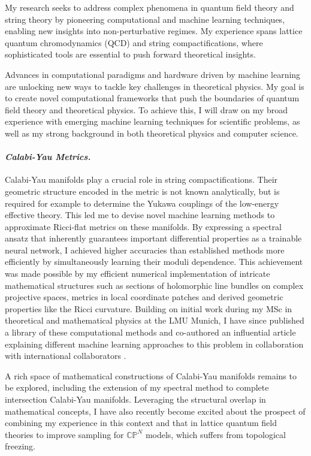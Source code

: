 \documentclass[11pt]{article}
\title{}
\author{}
\date{}
\begin{document}
\thispagestyle{firstpagestyle}


My research seeks to address complex phenomena in quantum field theory and string theory by pioneering computational and machine learning techniques, enabling new insights into non-perturbative regimes.
My experience spans lattice quantum chromodynamics (QCD) and string compactifications, where sophisticated tools are essential to push forward theoretical insights.

Advances in computational paradigms and hardware driven by machine learning are unlocking new ways to tackle key challenges in theoretical physics.
My goal is to create novel computational frameworks that push the boundaries of quantum field theory and theoretical physics.
To achieve this, I will draw on my broad experience with emerging machine learning techniques for scientific problems, as well as my strong background in both theoretical physics and computer science.

\paragraph{\textit{{Calabi-Yau Metrics.}}}
Calabi-Yau manifolds play a crucial role in string compactifications.
Their geometric structure encoded in the metric is not known analytically, but is required for example to determine the Yukawa couplings of the low-energy effective theory.
This led me to devise novel machine learning methods to approximate Ricci-flat metrics on these manifolds.
By expressing a spectral ansatz that inherently guarantees important differential properties as a trainable neural network, I achieved higher accuracies than established methods more efficiently by simultaneously learning their moduli dependence.
This achievement was made possible by my efficient numerical implementation of intricate mathematical structures such as sections of holomorphic line bundles on complex projective spaces, metrics in local coordinate patches and derived geometric properties like the Ricci curvature.
Building on initial work during my MSc in theoretical and mathematical physics at the LMU Munich, I have since published a library of these computational methods \cite{gerdes2023CYJAXPackage} and co-authored an influential article explaining different machine learning approaches to this problem in collaboration with international collaborators \cite{anderson2021ModulidependentCalabiYau}.

\textbf{\color{royalblue}{Future Directions.}}
A rich space of mathematical constructions of Calabi-Yau manifolds remains to be explored, including the extension of my spectral method to complete intersection Calabi-Yau manifolds.
Leveraging the structural overlap in mathematical concepts, I have also recently become excited about the prospect of combining my experience in this context and that in lattice quantum field theories to improve sampling for $\mathbb{CP}^N$ models, which suffers from topological freezing.
\end{document}
